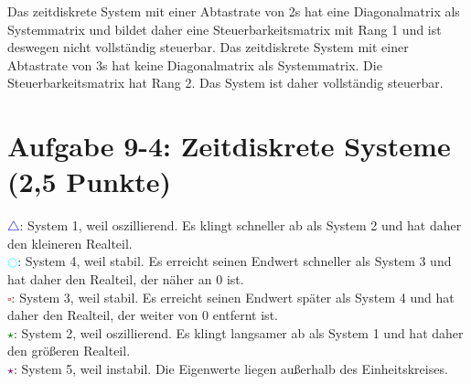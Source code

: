 \documentclass[11pt]{scrartcl} %
\begin{document}
Das zeitdiskrete System mit einer Abtastrate von 2s hat eine Diagonalmatrix als Systemmatrix und bildet daher eine Steuerbarkeitsmatrix mit Rang 1 und ist deswegen nicht vollständig steuerbar.
Das zeitdiskrete System mit einer Abtastrate von 3s hat keine Diagonalmatrix als Systemmatrix. Die Steuerbarkeitsmatrix hat Rang 2. Das System ist daher vollständig steuerbar.

\pagebreak
\section*{Aufgabe 9-4: Zeitdiskrete Systeme (2,5 Punkte)}
\textcolor{blue}{$\bigtriangleup$}: System 1, weil oszillierend. Es klingt schneller ab als System 2 und hat daher den kleineren Realteil.\\

\textcolor{cyan}{$\bigcirc$}: System 4, weil stabil. Es erreicht seinen Endwert schneller als System 3 und hat daher den Realteil, der näher an 0 ist.\\

\textcolor{brown}{$\square$}: System 3, weil stabil. Es erreicht seinen Endwert später als System 4 und hat daher den Realteil, der weiter von 0 entfernt ist.\\

\textcolor{green}{$\star$}: System 2, weil oszillierend. Es klingt langsamer ab als System 1 und hat daher den größeren Realteil.\\

\textcolor{purple}{$\star$}: System 5, weil instabil. Die Eigenwerte liegen außerhalb des Einheitskreises.\\


\newpage



\end{document}
